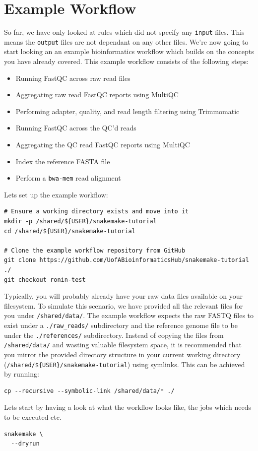 \section{Example Workflow}

So far, we have only looked at rules which did not specify any \texttt{input} files. This means the \texttt{output} files are not dependant on any other files.
We're now going to start looking an an example bioinformatics workflow which builds on the concepts you have already covered. This example workflow consists
of the following steps:

\begin{itemize}
  \item Running FastQC across raw read files
  \item Aggregating raw read FastQC reports using MultiQC
  \item Performing adapter, quality, and read length filtering using Trimmomatic
  \item Running FastQC across the QC'd reads
  \item Aggregating the QC read FastQC reports using MultiQC
  \item Index the reference FASTA file
  \item Perform a \texttt{bwa-mem} read alignment
\end{itemize}

\begin{steps}

Lets set up the example workflow:

\begin{lstlisting}
# Ensure a working directory exists and move into it
mkdir -p /shared/${USER}/snakemake-tutorial
cd /shared/${USER}/snakemake-tutorial

# Clone the example workflow repository from GitHub
git clone https://github.com/UofABioinformaticsHub/snakemake-tutorial ./
git checkout ronin-test
\end{lstlisting}

Typically, you will probably already have your raw data files available on your filesystem. To simulate this scenario, we have provided
all the relevant files for you under \texttt{/shared/data/}. The example workflow expects the raw FASTQ files to exist under a \texttt{./raw\_reads/}
subdirectory and the reference genome file to be under the \texttt{./references/} subdirectory. Instead of copying the files from \texttt{/shared/data/}
and wasting valuable filesystem space, it is recommended that you mirror the provided directory structure in your current working directory
(\texttt{/shared/\$\{USER\}/snakemake-tutorial}) using symlinks. This can be achieved by running:

\begin{lstlisting}
cp --recursive --symbolic-link /shared/data/* ./
\end{lstlisting}

Lets start by having a look at what the workflow looks like, the jobs which needs to be executed etc.

\begin{lstlisting}
snakemake \
  --dryrun
\end{lstlisting}
\end{steps}

